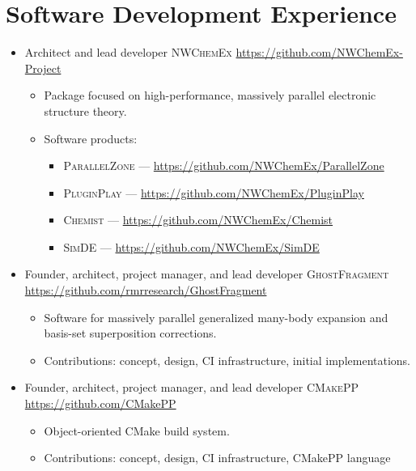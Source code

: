 \documentclass[11pt,a4paper,sans]{moderncv}
\begin{document}
\section{Software Development Experience}
\begin{itemize}
	\item{
		{Architect and lead developer}
		{\textsc{NWChemEx}}
		{\url{https://github.com/NWChemEx-Project}}
		{}
		{\begin{itemize}
			\item{Package focused on high-performance, massively parallel
			      electronic structure theory.}
		    \item{Software products:
		    	\begin{itemize}
		    		\item \textsc{ParallelZone} --- \url{https://github.com/NWChemEx/ParallelZone}
		    		\item \textsc{PluginPlay} --- \url{https://github.com/NWChemEx/PluginPlay}
		    		\item \textsc{Chemist} --- \url{https://github.com/NWChemEx/Chemist}
		    		\item \textsc{SimDE} --- \url{https://github.com/NWChemEx/SimDE}
		    	\end{itemize}
	    	}
			\end{itemize}
		}
	}
	\item{
          {Founder, architect, project manager, and lead developer}
          {\textsc{GhostFragment}}
          {\url{https://github.com/rmrresearch/GhostFragment}}
          {}
          {\begin{itemize}
          		\item{Software for massively parallel generalized many-body
          			  expansion and basis-set superposition corrections.}
                \item{Contributions: concept, design, CI infrastructure,
                	 initial implementations.}
            \end{itemize}
          }
    }
	\item{
		{Founder, architect, project manager, and lead developer}
		{\textsc{CMakePP}}
		{\url{https://github.com/CMakePP}}
		{}
		{\begin{itemize}
		  		\item{Object-oriented CMake build system.}
	 		    \item{Contributions: concept, design, CI infrastructure, CMakePP
		   	          language}

\end{itemize}}}
\end{itemize}
\end{document}

